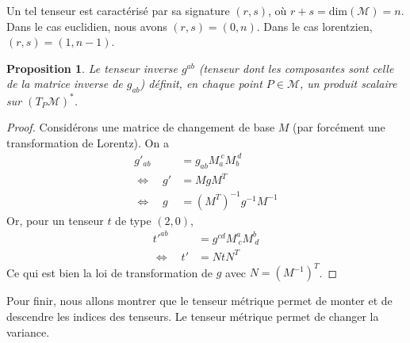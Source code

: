 \documentclass[a4paper,11pt]{report}
\theoremstyle{definition}
\theoremstyle{plain}
\newtheorem{prop}[thm]{Proposition}
\theoremstyle{definition}
\theoremstyle{remark}
\newcommand{\M}{\mathscr{M}}
\begin{document}
                Un tel tenseur est caractérisé par sa signature $(r,s)$, où $r+s = \text{dim}(\M) = n$. Dans le cas euclidien, nous avons $(r,s) = (0,n)$. Dans le cas lorentzien, $(r,s) = (1,n-1)$.
                
                \begin{prop}
                    Le tenseur inverse $g^{ab}$ (tenseur dont les composantes sont celle de la matrice inverse de $g_{ab}$) définit, en chaque point $P\in\M$, un produit scalaire sur $(T_P\M)^*$.
                \end{prop}
                
                \begin{proof}
                    Considérons une matrice de changement de base $M$ (par forcément une transformation de Lorentz). On a
                    \begin{align}
                        g'_{ab} &= g_{ab}M_{a}^{~c}M_{b}^{~d}\\
                        \Leftrightarrow \quad g'&= MgM^T \\
                        \Leftrightarrow \quad g &= (M^T)^{-1}g^{-1}M^{-1}
                    \end{align}
                    Or, pour un tenseur $t$ de type $(2,0)$,
                    \begin{align}
                        t'^{ab} &= g^{cd}M^{a}_{~c}M^{b}_{~d}\\
                        \Leftrightarrow \quad t'&= NtN^T
                    \end{align}
                    Ce qui est bien la loi de transformation de $g$ avec $N = (M^{-1})^T$.
                \end{proof}
                
                Pour finir, nous allons montrer que le tenseur métrique permet de monter et de descendre les indices des tenseurs. Le tenseur métrique permet de changer la variance.\\
                
\end{document}
